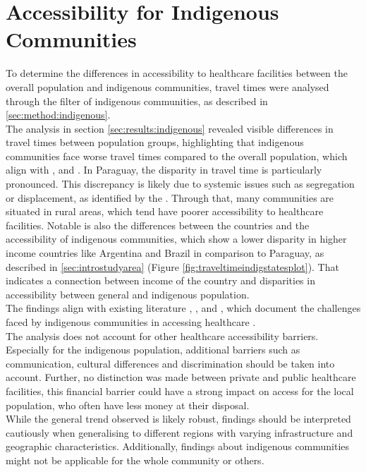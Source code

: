 \documentclass[11pt, a4paper]{report}
\begin{document}
\section{Accessibility for Indigenous Communities}

To determine the differences in accessibility to healthcare facilities between the overall population and indigenous communities, travel times were analysed through the filter of indigenous communities, as described in \ref{sec:method:indigenous}. \\
%
The analysis in section \ref{sec:results:indigenous} revealed visible differences in travel times between population groups, highlighting that indigenous communities face worse travel times compared to the overall population, which align with \cite{quintana_access_2021}, \cite{world_health_organization_access_2024} and \cite{santos_health_2022}. In Paraguay, the disparity in travel time is particularly pronounced. This discrepancy is likely due to systemic issues such as segregation or displacement, as identified by the \cite{united_nations_situation_2015}. Through that, many communities are situated in rural areas, which tend have poorer accessibility to healthcare facilities. Notable is also the differences between the countries and the accessibility of indigenous communities,  which show a lower disparity in higher income countries like Argentina and Brazil in comparison to Paraguay, as described in \ref{sec:introstudyarea} (Figure \ref{fig:traveltimeindigstatesplot}). That indicates a connection between income of the country and disparities in accessibility between general and indigenous population. \\
%
The findings align with existing literature \citet{davy_access_2016}, \cite{quintana_access_2021}, \cite{santos_health_2022} and \cite{world_health_organization_access_2024}, which document the challenges faced by indigenous communities in accessing healthcare . \\
%
The analysis does not account for other healthcare accessibility barriers. Especially for the indigenous population, additional barriers such as communication, cultural differences and discrimination should be taken into account. Further, no distinction was made between private and public healthcare facilities, this financial barrier could have a strong impact on access for the local population, who often have less money at their disposal. \\
%
While the general trend observed is likely robust, findings should be interpreted cautiously when generalising to different regions with varying infrastructure and geographic characteristics. Additionally, findings about indigenous communities might not be applicable for the whole community or others.\\
\end{document}
